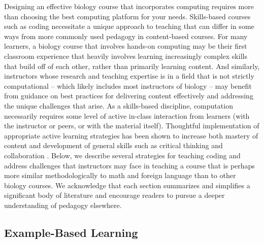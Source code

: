 Designing an effective biology course that incorporates computing requires more than choosing the best computing platform for your needs. Skills-based courses such as coding necessitate a unique approach to teaching that can differ in some ways from more commonly used pedagogy in content-based courses. 
For many learners, a biology course that involves hands-on computing may be their first classroom experience that heavily involves learning increasingly complex skills that build off of each other, rather than primarily learning content. And similarly, instructors whose research and teaching expertise is in a field that is not strictly computational -- which likely includes most instructors of biology -- may benefit from guidance on best practices for delivering content effectively and addressing the unique challenges that arise. As a skills-based discipline, computation 
necessarily requires some level of active in-class interaction from learners (with the instructor or peers, or with the material itself). Thoughtful implementation of appropriate active learning strategies has been shown to increase both mastery of content and development of general skills such as critical thinking and collaboration \citep{faust_paulson_1998}. Below, we describe several strategies for teaching coding and address challenges that instructors may face in teaching a course that is perhaps more similar methodologically to math and foreign language than to other biology courses.
We acknowledge that each section summarizes and simplifies a significant body of literature
and encourage readers to pursue a deeper understanding of pedagogy elsewhere.

\subsection{Example-Based Learning}

